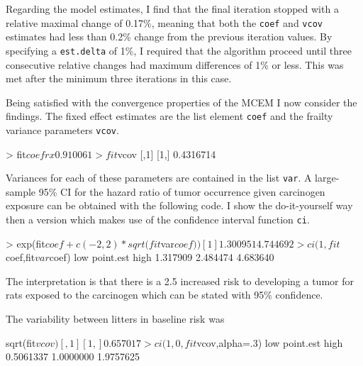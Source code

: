 Regarding the model estimates, I find that the final iteration
stopped with a relative maximal change of 0.17\%, meaning that both
the \texttt{coef} and \texttt{vcov} estimates had less than 0.2\% change
from the previous iteration values. By specifying a \texttt{est.delta}
of 1\%, I required that the algorithm proceed until three consecutive
relative changes had maximum differences of 1\% or less. This was met
after the minimum three iterations in this case.

Being satisfied with the convergence properties of the MCEM I now
consider the findings. The fixed effect estimates are the list element \texttt{coef} and the
frailty variance parameters \texttt{vcov}.

\begin{Schunk}
\begin{Sinput}
> fit$coef
      rx 
0.910061 

> fit$vcov
          [,1]
[1,] 0.4316714
\end{Sinput}
\end{Schunk}

Variances for each of these parameters are contained in the list
\texttt{var}. A large-sample 95\% CI for the hazard ratio
of tumor occurrence given carcinogen exposure can be obtained with the
following code. I show the do-it-yourself way then a version which
makes  use of the confidence interval function \texttt{ci}.

\begin{Schunk}
\begin{Sinput}
> exp(fit$coef+c(-2,2)*sqrt(fit$var$coef))
[1] 1.300951 4.744692

> ci(1,fit$coef,fit$var$coef)
      low point.est      high 
 1.317909  2.484474  4.683640 
\end{Sinput}
\end{Schunk}

The interpretation is that there is a 2.5 increased risk to developing
a tumor for rats exposed to the carcinogen which can be stated with
95\% confidence.

The variability between litters in baseline risk was

\begin{Schunk}
\begin{Sinput}
sqrt(fit$vcov)
         [,1]
[1,] 0.657017

> ci(1,0,fit$vcov,alpha=.3)
      low point.est      high 
0.5061337 1.0000000 1.9757625 
\end{Sinput}
\end{Schunk}

